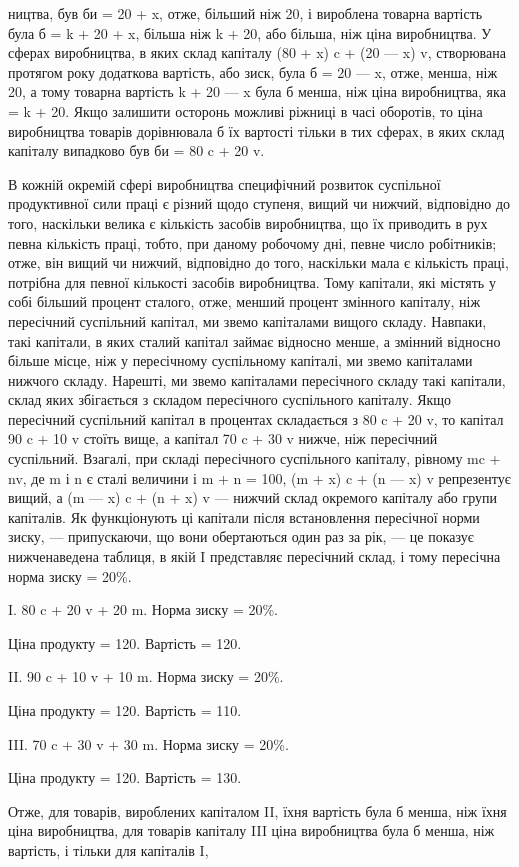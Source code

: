 ництва, був би = 20 + x, отже, більший ніж 20, і вироблена
товарна вартість була б = k + 20 + x, більша ніж k + 20, або
більша, ніж ціна виробництва. У сферах виробництва, в яких
склад капіталу (80 + x) c + (20 — x) v, створювана протягом року
додаткова вартість, або зиск, була б = 20 — x, отже, менша, ніж 20,
а тому товарна вартість k + 20 — x була б менша, ніж ціна виробництва, яка = k + 20. Якщо залишити
осторонь можливі ріжниці в часі оборотів, то ціна виробництва товарів дорівнювала б їх вартості
тільки в тих сферах, в яких склад капіталу випадково був би = 80 c + 20 v.

В кожній окремій сфері виробництва специфічний розвиток
суспільної продуктивної сили праці є різний щодо ступеня,
вищий чи нижчий, відповідно до того, наскільки велика є кількість засобів виробництва, що їх
приводить в рух певна кількість праці, тобто, при даному робочому дні, певне число робітників; отже,
він вищий чи нижчий, відповідно до того, наскільки
мала є кількість праці, потрібна для певної кількості засобів
виробництва. Тому капітали, які містять у собі більший процент
сталого, отже, менший процент змінного капіталу, ніж пересічний суспільний капітал, ми звемо
капіталами вищого складу.
Навпаки, такі капітали, в яких сталий капітал займає відносно
менше, а змінний відносно більше місце, ніж у пересічному
суспільному капіталі, ми звемо капіталами нижчого складу.
Нарешті, ми звемо капіталами пересічного складу такі капітали,
склад яких збігається з складом пересічного суспільного капіталу. Якщо пересічний суспільний капітал
в процентах складається з 80 c + 20 v, то капітал 90 c + 10 v стоїть вище, а капітал 70 c + 30 v
нижче, ніж пересічний суспільний. Взагалі, при
складі пересічного суспільного капіталу, рівному mc + nv, де
m і n є сталі величини і m + n = 100, (m + x) c + (n — x) v репрезентує вищий, а (m — x) c + (n + x)
v — нижчий склад окремого капіталу або групи капіталів. Як функціонують ці капітали після
встановлення пересічної норми зиску, — припускаючи, що
вони обертаються один раз за рік, — це показує нижченаведена
таблиця, в якій I представляє пересічний склад, і тому пересічна норма зиску = 20\%.

I. 80 c + 20 v + 20 m. Норма зиску = 20\%.

Ціна продукту = 120. Вартість = 120.

II.    90 c + 10 v + 10 m. Норма зиску = 20\%.

Ціна продукту = 120. Вартість = 110.

III. 70 c + 30 v + 30 m. Норма зиску = 20\%.

Ціна продукту = 120. Вартість = 130.

Отже, для товарів, вироблених капіталом II, їхня вартість була б
менша, ніж їхня ціна виробництва, для товарів капіталу III ціна
виробництва була б менша, ніж вартість, і тільки для капіталів I,
